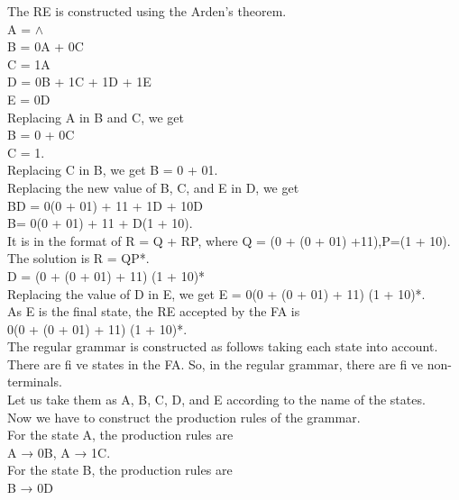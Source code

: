 \documentclass[10pt,a4paper]{book}
\begin{document}
 The RE is constructed using the Arden’s theorem.\\
 \hspace*{5.1cm}A = $\land$\\
\hspace*{5cm} B = 0A + 0C\\
\hspace*{5cm} C = 1A\\
\hspace*{5cm} D = 0B + 1C + 1D + 1E\\
\hspace*{5cm} E = 0D\\
Replacing A in B and C, we get\\
\hspace*{5cm}B = 0 + 0C\\
\hspace*{5cm}C = 1.\\
Replacing C in B, we get B = 0 + 01.\\
Replacing the new value of B, C, and E in D, we get\\
\hspace*{5cm}BD = 0(0 + 01) + 11 + 1D + 10D\\
\hspace*{5cm}B= 0(0 + 01) + 11 + D(1 + 10).\\
It is in the format of R = Q + RP, where Q = (0 + (0 + 01) +11),P=(1 + 10).\\
 The solution is R = QP*.\\
 \hspace*{5cm}D = (0 + (0 + 01) + 11) (1 + 10)*\\
 Replacing the value of D in E, we get E = 0(0 + (0 + 01) + 11) (1 + 10)*.\\
 As E is the final state, the RE accepted by the FA is\\
\hspace*{5cm}0(0 + (0 + 01) + 11) (1 + 10)*.\\
The regular grammar is constructed as follows taking each state into account.\\
 There are fi ve states in the FA. So, in the regular grammar, there are fi ve non-terminals.\\
 Let us take them as A, B, C, D, and E according to the name of the states.\\
 Now we have to construct the production rules of the grammar.\\
 For the state A, the production rules are\\
 \hspace*{5cm}A → 0B, A → 1C.\\
 For the state B, the production rules are\\
 \hspace*{5cm}B → 0D \newpage
 
\end{document}
